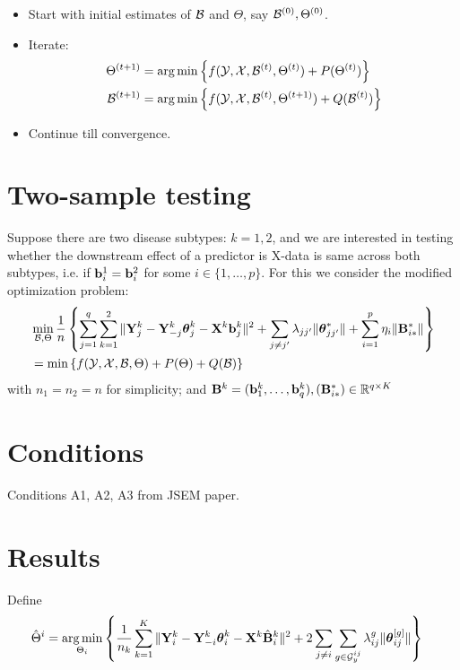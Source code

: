 \documentclass[fleqn,11pt]{article}
\DeclareMathOperator*{\argmin}{arg\,min}
\numberwithin{equation}{section}
\begin{document}
\begin{itemize}
\item Start with initial estimates of ${\cal{B}}$ and $\Theta$, say ${\cal{B}}^{(0)}, \Theta^{(0)}$.
\item Iterate:
%
\begin{align}
\Theta^{(t+1)} &= \argmin \left\{ f ( \cY, \cX, \cB^{(t)}, \Theta^{(t)}) + P (\Theta^{(t)}) \right\}\\
\cB^{(t+1)} &= \argmin \left\{ f ( \cY, \cX, \cB^{(t)}, \Theta^{(t+1)}) + Q (\cB^{(t)}) \right\}
\end{align}
\item Continue till convergence.
\end{itemize}
%

\section{Two-sample testing}
Suppose there are two disease subtypes: $k = 1,2$, and we are interested in testing whether the downstream effect of a predictor is X-data is same across both subtypes, i.e. if ${\bf{b}}_i^1 = {\bf{b}}_i^2$ for some $i \in \{ 1, \ldots, p \}$. For this we consider the modified optimization problem:
%
\begin{align}
& \min_{{\cal{B}}, \Theta} \frac{1}{n} \left\{ \sum_{j=1}^q \sum_{k=1}^2 \| {\mathbf{Y}}_j^k - {\mathbf{Y}}_{-j}^k {\boldsymbol{\theta}}_j^k - {\mathbf{X}}^k {\bf{b}}_{j}^k \|^2 + \sum_{j \neq j'} \lambda_{jj'} \| {\boldsymbol{\theta}}_{jj'}^* \| + \sum_{i=1}^p \eta_i \| {\mathbf{B}}_{i*}^* \| \right\}\\
&= \min \left\{ f ( {\cal{Y}}, {\cal{X}}, {\cal{B}}, \Theta) + P (\Theta) + Q ({\cal{B}}) \right\} 
\end{align}
%
with $n_1 = n_2 = n$ for simplicity; and ${\mathbf{B}}^k = ({\bf{b}}_1^k, \ldots, {\bf{b}}_q^k), ({\mathbf{B}}_{i*}^*) \in {\mathbb{R}}^{ q \times K}$

\section{Conditions}
Conditions A1, A2, A3 from JSEM paper.

\section{Results}
Define
%
\begin{align}
\hat \Theta^i &= \argmin_{\Theta_i} \left\{ \frac{1}{n_k} \sum_{k=1}^K \| \bfY^k_i - \bfY_{-i}^k \bftheta_i^k - \bfX^k \hat \bfB_i^k \|^2 + 2 \sum_{j \neq i} \sum_{g \in \cG_y^{ij}} \lambda_{ij}^g \| \bftheta_{ij}^{[g]} \| \right\}
\end{align}
\end{document}
